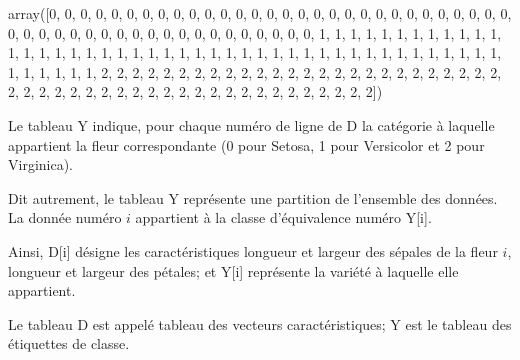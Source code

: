 \documentclass[letterpaper,10pt,english]{jupyterBook}
\begin{document}
\begin{sphinxVerbatimInput}

\begin{sphinxVerbatim}[commandchars=\\\{\}]
\PYG{p}{[}\PYG{p}{[}\PYG{p}{]}    \PYG{p}{]}
\end{sphinxVerbatim}
\end{sphinxVerbatimInput}
\begin{sphinxVerbatimInput}

\begin{sphinxVerbatim}[commandchars=\\\{\}]
\end{sphinxVerbatim}
\end{sphinxVerbatimInput}
\begin{sphinxVerbatimOutput}

\begin{sphinxVerbatim}[commandchars=\\\{\}]
array([0, 0, 0, 0, 0, 0, 0, 0, 0, 0, 0, 0, 0, 0, 0, 0, 0, 0, 0, 0, 0, 0,
       0, 0, 0, 0, 0, 0, 0, 0, 0, 0, 0, 0, 0, 0, 0, 0, 0, 0, 0, 0, 0, 0,
       0, 0, 0, 0, 0, 0, 1, 1, 1, 1, 1, 1, 1, 1, 1, 1, 1, 1, 1, 1, 1, 1,
       1, 1, 1, 1, 1, 1, 1, 1, 1, 1, 1, 1, 1, 1, 1, 1, 1, 1, 1, 1, 1, 1,
       1, 1, 1, 1, 1, 1, 1, 1, 1, 1, 1, 1, 2, 2, 2, 2, 2, 2, 2, 2, 2, 2,
       2, 2, 2, 2, 2, 2, 2, 2, 2, 2, 2, 2, 2, 2, 2, 2, 2, 2, 2, 2, 2, 2,
       2, 2, 2, 2, 2, 2, 2, 2, 2, 2, 2, 2, 2, 2, 2, 2, 2, 2])
\end{sphinxVerbatim}
\end{sphinxVerbatimOutput}

\sphinxAtStartPar
Le tableau Y indique, pour chaque numéro de ligne de D la catégorie à laquelle appartient la fleur correspondante (0 pour Setosa, 1 pour Versicolor et 2 pour Virginica).

\sphinxAtStartPar
Dit autrement, le tableau Y représente une partition de l’ensemble des données. La donnée numéro \(i\) appartient à la classe d’équivalence numéro Y{[}i{]}.

\sphinxAtStartPar
Ainsi, D{[}i{]} désigne les caractéristiques longueur et largeur des sépales de la fleur \(i\), longueur et largeur des pétales; et Y{[}i{]} représente la variété à laquelle elle appartient.

\sphinxAtStartPar
Le tableau D est appelé tableau des vecteurs caractéristiques; Y est le tableau des étiquettes de classe.
\end{document}
